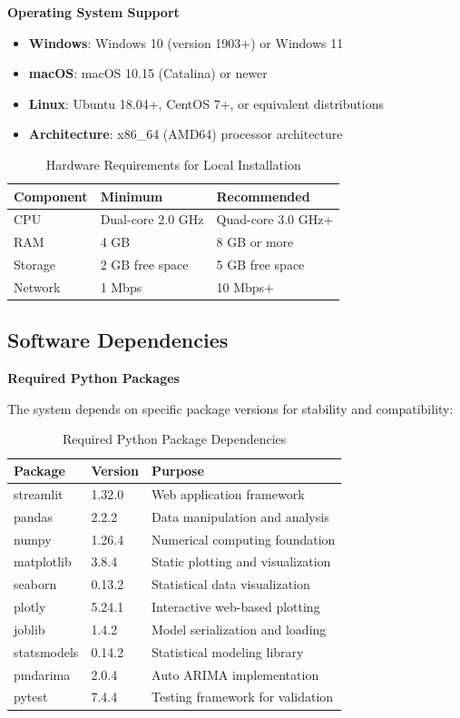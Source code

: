 \textbf{Operating System Support}
\begin{itemize}
	\item \textbf{Windows}: Windows 10 (version 1903+) or Windows 11
	\item \textbf{macOS}: macOS 10.15 (Catalina) or newer
	\item \textbf{Linux}: Ubuntu 18.04+, CentOS 7+, or equivalent distributions
	\item \textbf{Architecture}: x86\_64 (AMD64) processor architecture
\end{itemize}

\begin{table}[H]
	\centering
	\begin{tabularx}{\textwidth}{|X|X|X|}
		\hline
		\textbf{Component} & \textbf{Minimum} & \textbf{Recommended} \\
		\hline
		CPU & Dual-core 2.0 GHz & Quad-core 3.0 GHz+ \\
		RAM & 4 GB & 8 GB or more \\
		Storage & 2 GB free space & 5 GB free space \\
		Network & 1 Mbps & 10 Mbps+ \\
		\hline
	\end{tabularx}
	\caption{Hardware Requirements for Local Installation}
	\label{tab:hardware_requirements}
\end{table}

\subsection{Software Dependencies}

\textbf{Required Python Packages}

The system depends on specific package versions for stability and compatibility:

\begin{table}[H]
	\centering
	\begin{tabularx}{\textwidth}{|X|X|X|}
		\hline
		\textbf{Package} & \textbf{Version} & \textbf{Purpose} \\
		\hline
		streamlit & 1.32.0 & Web application framework \\
		pandas & 2.2.2 & Data manipulation and analysis \\
		numpy & 1.26.4 & Numerical computing foundation \\
		matplotlib & 3.8.4 & Static plotting and visualization \\
		seaborn & 0.13.2 & Statistical data visualization \\
		plotly & 5.24.1 & Interactive web-based plotting \\
		joblib & 1.4.2 & Model serialization and loading \\
		statsmodels & 0.14.2 & Statistical modeling library \\
		pmdarima & 2.0.4 & Auto ARIMA implementation \\
		pytest & 7.4.4 & Testing framework for validation \\
		\hline
	\end{tabularx}
	\caption{Required Python Package Dependencies}
	\label{tab:python_dependencies}
\end{table}

